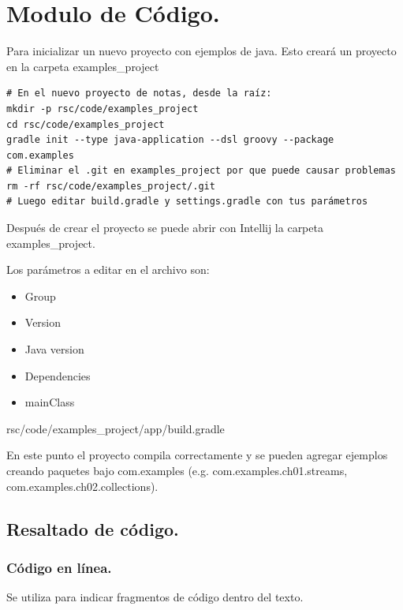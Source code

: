 \chapter{Modulo de Código.}

Para inicializar un nuevo proyecto con ejemplos de java. Esto creará un proyecto en la carpeta examples\_project

\begin{lstlisting}[style=terminal]
# En el nuevo proyecto de notas, desde la raíz:
mkdir -p rsc/code/examples_project
cd rsc/code/examples_project
gradle init --type java-application --dsl groovy --package com.examples
# Eliminar el .git en examples_project por que puede causar problemas
rm -rf rsc/code/examples_project/.git
# Luego editar build.gradle y settings.gradle con tus parámetros
\end{lstlisting}

Después de crear el proyecto se puede abrir con Intellij la carpeta examples\_project.

Los parámetros a editar en el archivo  son: 

\begin{itemize}
    \item Group
    \item Version
    \item Java version
    \item Dependencies
    \item mainClass
\end{itemize}


{rsc/code/examples_project/app/build.gradle}

En este punto el proyecto compila correctamente y se pueden agregar ejemplos creando paquetes bajo com.examples (e.g. com.examples.ch01.streams, com.examples.ch02.collections).

\section{Resaltado de código.}

    \subsection{Código en línea.}
    
    Se utiliza para indicar fragmentos de código dentro del texto.


